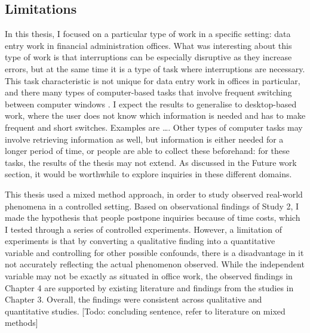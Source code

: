 \subsection{Limitations}
In this thesis, I focused on a particular type of work in a specific setting: data entry work in financial administration offices. What was interesting about this type of work is that interruptions can be especially disruptive as they increase errors, but at the same time it is a type of task where interruptions are necessary. This task characteristic is not unique for data entry work in offices in particular, and there many types of computer-based tasks that involve frequent switching between computer windows \citep{Czerwinski2004}. I expect the results to generalise to desktop-based work, where the user does not know which information is needed and has to make frequent and short switches. Examples are …. Other types of computer tasks may involve retrieving information as well, but information is either needed for a longer period of time, or people are able to collect these beforehand: for these tasks, the results of the thesis may not extend. As discussed in the Future work section, it would be worthwhile to explore inquiries in these different domains. 

This thesis used a mixed method approach, in order to study observed real-world phenomena in a controlled setting. Based on observational findings of Study 2, I made the hypothesis that people postpone inquiries because of time costs, which I tested through a series of controlled experiments. However, a limitation of experiments is that by converting a qualitative finding into a quantitative variable and controlling for other possible confounds, there is a disadvantage in it not accurately reflecting the actual phenomenon observed. While the independent variable may not be exactly as situated in office work, the observed findings in Chapter 4 are supported by existing literature and findings from the studies in Chapter 3. Overall, the findings were consistent across qualitative and quantitative studies. [Todo: concluding sentence, refer to literature on mixed methods]


